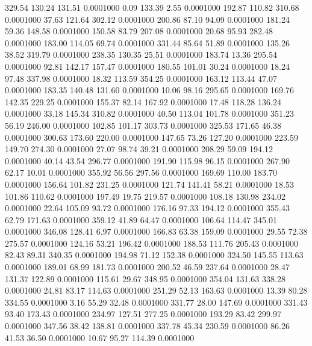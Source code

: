  329.54  130.24  131.51   0.0001000
   0.09  133.39    2.55   0.0001000
 192.87  110.82  310.68   0.0001000
  37.63  121.64  302.12   0.0001000
 200.86   87.10   94.09   0.0001000
 181.24   59.36  148.58   0.0001000
 150.58   83.79  207.08   0.0001000
  20.68   95.93  282.48   0.0001000
 183.00  114.05   69.74   0.0001000
 331.44   85.64   51.89   0.0001000
 135.26   38.52  319.79   0.0001000
 238.35  130.35   25.51   0.0001000
 183.74   13.36  295.54   0.0001000
  92.81  142.17  157.47   0.0001000
 180.55  101.01   30.24   0.0001000
  18.24   97.48  337.98   0.0001000
  18.32  113.59  354.25   0.0001000
 163.12  113.44   47.07   0.0001000
 183.35  140.48  131.60   0.0001000
  10.06   98.16  295.65   0.0001000
 169.76  142.35  229.25   0.0001000
 155.37   82.14  167.92   0.0001000
  17.48  118.28  136.24   0.0001000
  33.18  145.34  310.82   0.0001000
  40.50  113.04  101.78   0.0001000
 351.23   56.19  246.00   0.0001000
 102.85  101.17  303.73   0.0001000
 325.53  171.65   46.38   0.0001000
 300.63  173.60  220.00   0.0001000
 147.65   73.26  127.20   0.0001000
 223.59  149.70  274.30   0.0001000
  27.07   98.74   39.21   0.0001000
 208.29   59.09  194.12   0.0001000
  40.14   43.54  296.77   0.0001000
 191.90  115.98   96.15   0.0001000
 267.90   62.17   10.01   0.0001000
 355.92   56.56  297.56   0.0001000
 169.69  110.00  183.70   0.0001000
 156.64  101.82  231.25   0.0001000
 121.74  141.41   58.21   0.0001000
  18.53  101.86  110.62   0.0001000
 197.49   19.75  219.57   0.0001000
 108.18  130.98  234.02   0.0001000
  22.64  105.09   93.72   0.0001000
 176.16   97.33  194.12   0.0001000
 355.43   62.79  171.63   0.0001000
 359.12   41.89   64.47   0.0001000
 106.64  114.47  345.01   0.0001000
 346.08  128.41    6.97   0.0001000
 166.83   63.38  159.09   0.0001000
  29.55   72.38  275.57   0.0001000
 124.16   53.21  196.42   0.0001000
 188.53  111.76  205.43   0.0001000
  82.43   89.31  340.35   0.0001000
 194.98   71.12  152.38   0.0001000
 324.50  145.55  113.63   0.0001000
 189.01   68.99  181.73   0.0001000
 200.52   46.59  237.64   0.0001000
  28.47  131.37  122.89   0.0001000
 115.61   29.67  348.95   0.0001000
 354.04  131.63  338.28   0.0001000
  24.81   83.17  114.63   0.0001000
 251.29   52.13  163.63   0.0001000
  13.39   80.28  334.55   0.0001000
   3.16   55.29   32.48   0.0001000
 331.77   28.00  147.69   0.0001000
 331.43   93.40  173.43   0.0001000
 234.97  127.51  277.25   0.0001000
 193.29   83.42  299.97   0.0001000
 347.56   38.42  138.81   0.0001000
 337.78   45.34  230.59   0.0001000
  86.26   41.53   36.50   0.0001000
  10.67   95.27  114.39   0.0001000

